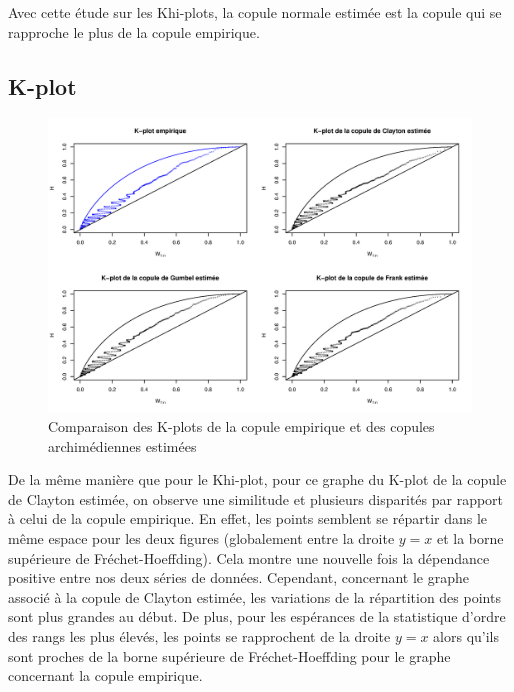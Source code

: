 Avec cette étude sur les Khi-plots, la copule normale estimée est la copule qui se rapproche le plus de la copule empirique.

\subsection{K-plot}

\noindent%
\begin{figure}[H]
    \begin{center}
      \includegraphics[width=17 cm, angle=0]{./pictures/archcmlkplot.png}
      \centering\caption{\label{2}Comparaison des K-plots de la copule empirique et des copules archimédiennes estimées}
    \end{center}
\end{figure}

De la même manière que pour le Khi-plot, pour ce graphe du K-plot de la copule de Clayton estimée, on observe une similitude et plusieurs disparités par rapport à celui de la copule empirique. En effet, les points semblent se répartir dans le même espace pour les deux figures (globalement entre la droite $y=x$ et la borne supérieure de Fréchet-Hoeffding). Cela montre une nouvelle fois la dépendance positive entre nos deux séries de données. Cependant, concernant le graphe associé à la copule de Clayton estimée, les variations de la répartition des points sont plus grandes au début. De plus, pour les espérances de la statistique d'ordre des rangs les plus élevés, les points se rapprochent de la droite $y=x$ alors qu'ils sont proches de la borne supérieure de Fréchet-Hoeffding pour le graphe concernant la copule empirique.

